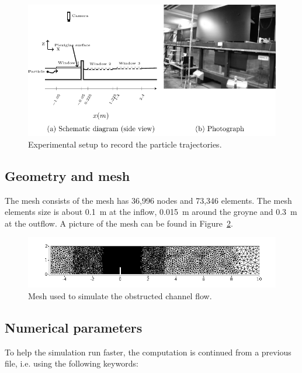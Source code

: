 \begin{figure}[H]
\begin{center}
  \includegraphics[]{./img/CanalAlgExpSetup2}
\end{center}
\caption{Experimental setup to record the particle trajectories.}
\label{fig:exp_setup2}
\end{figure}

\subsection{Geometry and mesh}

The mesh consists of the mesh has 36,996 nodes and 73,346 elements.
The mesh elements size is about 0.1~m at the inflow, 0.015~m around the groyne
and 0.3~m at the outflow.
A picture of the mesh can be found in Figure~\ref{fig:mesh_obstruc_channel}.

\begin{figure}[H]
\begin{center}
  \includegraphics[width=0.85\linewidth]{./img/Images/mesh_obstruc_channel}
\end{center}
\caption{Mesh used to simulate the obstructed channel flow.}
\label{fig:mesh_obstruc_channel}
\end{figure}

\subsection{Numerical parameters}
To help the simulation run faster, the computation is continued from a previous
file, i.e. using the following keywords:

